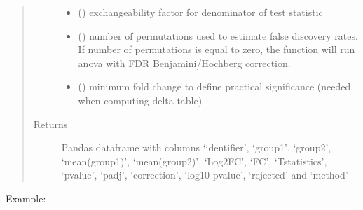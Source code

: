 \documentclass[letterpaper,10pt,english]{sphinxmanual}
\begin{document}
\begin{fulllineitems}
\begin{quote}
\begin{description}
\begin{itemize}
\item {} 
 () \textendash{} exchangeability factor for denominator of test statistic

\item {} 
 () \textendash{} number of permutations used to estimate false discovery rates. If number of permutations is equal to zero, the function will run anova with FDR Benjamini/Hochberg correction.

\item {} 
 () \textendash{} minimum fold change to define practical significance (needed when computing delta table)

\end{itemize}

\item[{Returns}] \leavevmode
Pandas dataframe with columns ‘identifier’, ‘group1’, ‘group2’, ‘mean(group1)’, ‘mean(group2)’, ‘Log2FC’, ‘FC’, ‘T\sphinxhyphen{}statistics’, ‘p\sphinxhyphen{}value’, ‘padj’, ‘correction’, ‘\sphinxhyphen{}log10 p\sphinxhyphen{}value’, ‘rejected’ and ‘method’

\end{description}\end{quote}

Example:

\begin{sphinxVerbatim}[commandchars=\\\{\}]
     \PYG{p}{[} \PYG{p}{]}    
\end{sphinxVerbatim}

\end{fulllineitems}
\end{document}
